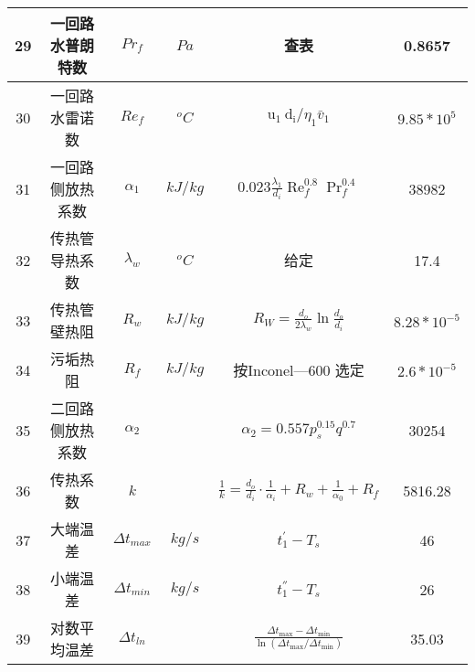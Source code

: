 \begin{table}[H]
{\begin{tabular}{|c|c|c|c|c|c|}
            29   & 一回路水普朗特数 & $ Pr_f $            & $ Pa $    & 查表                                                                                               & 0.8657           \\ \hline
            30   & 一回路水雷诺数   & $ Re_f $            & $ ^oC $   & $ \mathrm{u}_{1} \mathrm{~d}_{\mathrm{i}} / \eta_{1} \bar{v}_{1} $                                 & $ 9.85*10^{5} $  \\ \hline
            31   & 一回路侧放热系数 & $ \alpha_1 $        & $ kJ/kg $ & $ 0.023 \frac{\lambda_{1}}{d_{i}} \operatorname{Re}_{f}^{0.8} \operatorname{Pr}_{f}^{0.4} $        & 38982            \\ \hline
            32   & 传热管导热系数   & $ \lambda_w $       & $ ^oC $   & 给定                                                                                               & 17.4             \\ \hline
            33   & 传热管壁热阻     & $ R_w $             & $ kJ/kg $ & $ R_{W}=\frac{d_{o}}{2 \lambda_{w}} \ln \frac{d_{o}}{d_{i}} $                                      & $ 8.28*10^{-5} $ \\ \hline
            34   & 污垢热阻         & $ R_f $             & $ kJ/kg $ & 按Inconel—600 选定                                                                                 & $ 2.6*10^{-5} $  \\ \hline
            35   & 二回路侧放热系数 & $ \alpha_2 $        &           & $ \alpha_{2}=0.557 p_{s}^{0.15} q^{0.7} $                                                          & 30254            \\ \hline
            36   & 传热系数         & $ k $               &           & $ \frac{1}{k}=\frac{d_{o}}{d_{i}} \cdot \frac{1}{\alpha_{i}}+R_{w}+\frac{1}{\alpha_{0}}+R_{f} $    & 5816.28          \\ \hline
            37   & 大端温差         & $ \Delta t_{max} $  & $ kg/s $  & $ t_{1}^{'} - T_s $                                                                                & 46               \\ \hline
            38   & 小端温差         & $ \Delta t_{min} $  & $ kg/s $  & $ t_{1}^{''} - T_s $                                                                               & 26               \\ \hline
            39   & 对数平均温差     & $ \Delta t_{ln} $   &           & $ \frac{\Delta t_{\max }-\Delta t_{\min }}{\ln \left(\Delta t_{\max } / \Delta t_{\min }\right)} $ & 35.03            \\ \hline

\end{tabular}}
\end{table}
